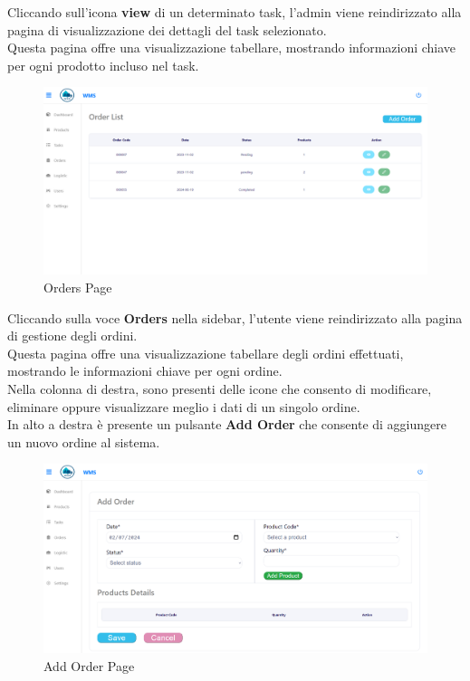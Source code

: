 Cliccando sull'icona \textbf{view} di un determinato task, l’admin viene
reindirizzato alla pagina di visualizzazione dei dettagli del task selezionato.\\
Questa pagina offre una visualizzazione tabellare, mostrando informazioni chiave per ogni prodotto
incluso nel task.

\begin{figure}[H]
    \centering
    \includegraphics[width=\textwidth]{document/sections/img/Storyboard/orderPage.png}
    \caption{Orders Page}
    \label{fig:ordersPage}
\end{figure}

Cliccando sulla voce \textbf{Orders} nella sidebar, l'utente viene reindirizzato alla pagina di gestione degli ordini.\\
Questa pagina offre una visualizzazione tabellare degli ordini effettuati,
mostrando le informazioni chiave per ogni ordine.\\
Nella colonna di destra, sono presenti delle icone che consento di modificare, eliminare oppure visualizzare meglio
i dati di un singolo ordine.\\
In alto a destra è presente un pulsante \textbf{Add Order} che consente di aggiungere un nuovo ordine al sistema.

\begin{figure}[H]
    \centering
    \includegraphics[width=\textwidth]{document/sections/img/Storyboard/addOrderPage.png}
    \caption{Add Order Page}
    \label{fig:addOrderPages}
\end{figure}


